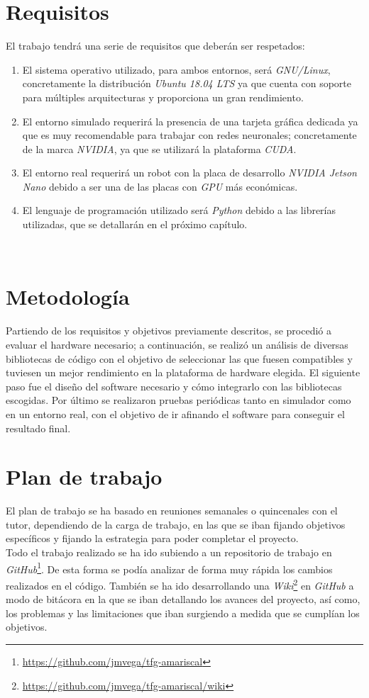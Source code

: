\section{Requisitos}
\label{sec:requisitos}
El trabajo tendrá una serie de requisitos que deberán ser respetados:
\begin{enumerate}
	\item El sistema operativo utilizado, para ambos entornos, será \textit{GNU/Linux}, concretamente la distribución \textit{Ubuntu 18.04 LTS} ya que cuenta con soporte para múltiples arquitecturas y proporciona un gran rendimiento.
	\item El entorno simulado requerirá la presencia de una tarjeta gráfica dedicada ya que es muy recomendable para trabajar con redes neuronales; concretamente de la marca \textit{NVIDIA}, ya que se utilizará la plataforma \textit{CUDA}.
	\item El entorno real requerirá un robot con la placa de desarrollo \textit{NVIDIA Jetson Nano} debido a ser una de las placas con \textit{GPU} más económicas.
	\item El lenguaje de programación utilizado será \textit{Python} debido a las librerías utilizadas, que se detallarán en el próximo capítulo.
\end{enumerate}\

\section{Metodología}
\label{sec:metodologia}
Partiendo de los requisitos y objetivos previamente descritos, se procedió a evaluar el hardware necesario; a continuación, se realizó un análisis de diversas bibliotecas de código con el objetivo de seleccionar las que fuesen compatibles y tuviesen un mejor rendimiento en la plataforma de hardware elegida. El siguiente paso fue el diseño del software necesario y cómo integrarlo con las bibliotecas escogidas. Por último se realizaron pruebas periódicas tanto en simulador como en un entorno real, con el objetivo de ir afinando el software para conseguir el resultado final.\\

\section{Plan de trabajo}
\label{sec:plantrabajo}

El plan de trabajo se ha basado en reuniones semanales o quincenales con el tutor, dependiendo de la carga de trabajo, en las que se iban fijando objetivos específicos y fijando la estrategia para poder completar el proyecto.\\

Todo el trabajo realizado se ha ido subiendo a un repositorio de trabajo en \textit{GitHub}\footnote{\url{https://github.com/jmvega/tfg-amariscal}}. De esta forma se podía analizar de forma muy rápida los cambios realizados en el código. También se ha ido desarrollando una \textit{Wiki}\footnote{\url{https://github.com/jmvega/tfg-amariscal/wiki}} en \textit{GitHub} a modo de bitácora en la que se iban detallando los avances del proyecto, así como, los problemas y las limitaciones que iban surgiendo a medida que se cumplían los objetivos.\\
